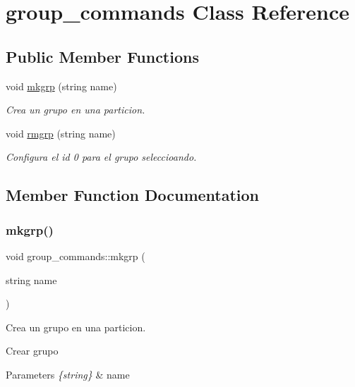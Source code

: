 \hypertarget{classgroup__commands}{}\section{group\+\_\+commands Class Reference}
\label{classgroup__commands}
\subsection*{Public Member Functions}
\begin{DoxyCompactItemize}
\item 
void \hyperlink{classgroup__commands_a333c1ce212ad3c9f24692eec6c6b8c12}{mkgrp} (string name)
\begin{DoxyCompactList}\small\item\em Crea un grupo en una particion. \end{DoxyCompactList}\item 
void \hyperlink{classgroup__commands_acc331b882e646298ca4c3ff4678ff34c}{rmgrp} (string name)
\begin{DoxyCompactList}\small\item\em Configura el id 0 para el grupo seleccioando. \end{DoxyCompactList}\end{DoxyCompactItemize}


\subsection{Member Function Documentation}
\mbox{\label{classgroup__commands_a333c1ce212ad3c9f24692eec6c6b8c12}} 
\subsubsection{\texorpdfstring{mkgrp()}{mkgrp()}}
{\footnotesize\ttfamily void group\+\_\+commands\+::mkgrp (\begin{DoxyParamCaption}\item[{string}]{name }\end{DoxyParamCaption})}



Crea un grupo en una particion. 

Crear grupo 
\begin{DoxyParams}{Parameters}
{\em \{string\}} & name \\
\hline
\end{DoxyParams}
\mbox{\label{classgroup__commands_acc331b882e646298ca4c3ff4678ff34c}} 

